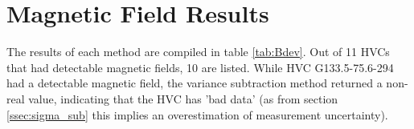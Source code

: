 %
%
%
%
%

\section{Magnetic Field Results}
\label{sec:results}

The results of each method are compiled in table \ref{tab:Bdev}. Out of 11 HVCs that had detectable magnetic fields, 10 are listed. While HVC G133.5-75.6-294 had a detectable magnetic field, the variance subtraction method returned a non-real value, indicating that the HVC has 'bad data' (as from section \ref{ssec:sigma_sub} this implies an overestimation of measurement uncertainty).


